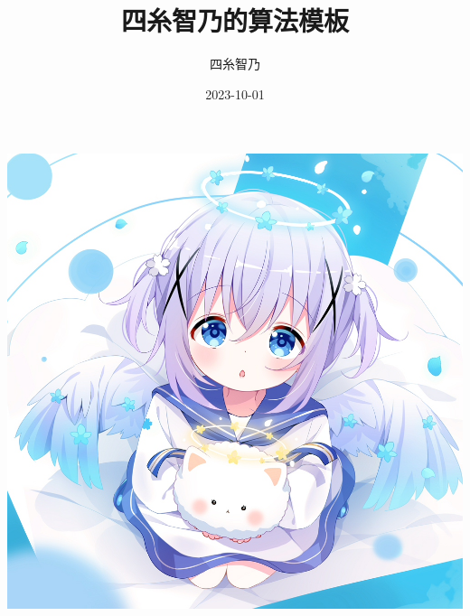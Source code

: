 \documentclass{article}
\begin{document}
\begin{CJK*}{UTF8}{gbsn}




\date{2023-10-01}
\title{四糸智乃的算法模板}
\author{四糸智乃}

\maketitle
\begin{center}
\includegraphics[width=1.0\textwidth]{./resource/title.jpg}
\end{center}

\newpage
\newpage

\twocolumn

\tableofcontents

\newcommand{\currentsection}{}
\let\oldsection\section
\renewcommand{\section}[1]{\oldsection{#1}\renewcommand{\currentsection}{#1}}

\newcommand{\currentsubsection}{}
\let\oldsubsection\subsection
\renewcommand{\subsection}[1]{\oldsubsection{#1}\renewcommand{\currentsubsection}{#1}}


\end{CJK*}
\end{document}
